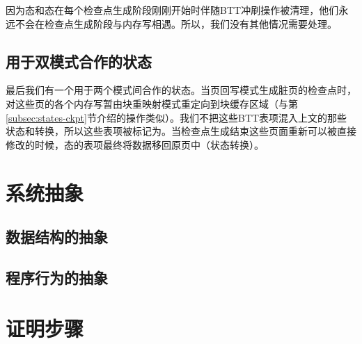 \begin{itemize}
因为态和态在每个检查点生成阶段刚刚开始时伴随BTT冲刷操作被清理，他们永远不会在检查点生成阶段与内存写相遇。所以，我们没有其他情况需要处理。

\subsection{用于双模式合作的状态}

最后我们有一个用于两个模式间合作的状态。当页回写模式生成脏页的检查点时，对这些页的各个内存写暂由块重映射模式重定向到块缓存区域（与第\ref{subsec:states-ckpt}节介绍的操作类似）。我们不把这些BTT表项混入上文的那些状态和转换，所以这些表项被标记为。当检查点生成结束这些页面重新可以被直接修改的时候，态的表项最终将数据移回原页中（状态转换）。

\section{系统抽象}

\subsection{数据结构的抽象}

\subsection{程序行为的抽象}

\section{证明步骤}

\end{itemize}

